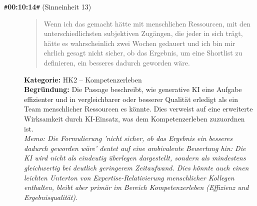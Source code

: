 \begin{description}
  \item[\texttt{\#}\textbf{00:10:14}\texttt{\#} (Sinneinheit 13)]
  \begin{quote}
  Wenn ich das gemacht hätte mit menschlichen Ressourcen, mit den unterschiedlichsten subjektiven Zugängen, die jeder in sich trägt, hätte es wahrscheinlich zwei Wochen gedauert und ich bin mir ehrlich gesagt nicht sicher, ob das Ergebnis, um eine Shortlist zu definieren, ein besseres dadurch geworden wäre.
  \end{quote}
  \textbf{Kategorie:} HK2 -- Kompetenzerleben\\
  \textbf{Begr\"undung:} Die Passage beschreibt, wie generative KI eine Aufgabe effizienter und in vergleichbarer oder besserer Qualität erledigt als ein Team menschlicher Ressourcen es könnte. Dies verweist auf eine erweiterte Wirksamkeit durch KI-Einsatz, was dem Kompetenzerleben zuzuordnen ist.
  \\\textit{Memo: Die Formulierung 'nicht sicher, ob das Ergebnis ein besseres dadurch geworden wäre' deutet auf eine ambivalente Bewertung hin: Die KI wird nicht als eindeutig überlegen dargestellt, sondern als mindestens gleichwertig bei deutlich geringerem Zeitaufwand. Dies könnte auch einen leichten Unterton von Expertise-Relativierung menschlicher Kollegen enthalten, bleibt aber primär im Bereich Kompetenzerleben (Effizienz und Ergebnisqualität).}
\end{description}
\medskip

